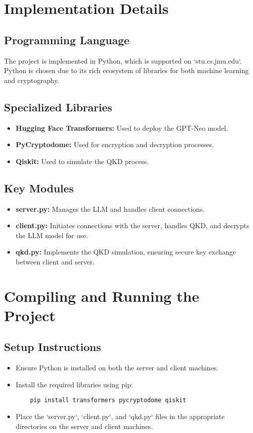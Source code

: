 \documentclass{article}
\begin{document}
\section{Implementation Details}

\subsection{Programming Language}
The project is implemented in Python, which is supported on `stu.cs.jmu.edu`. Python is chosen due to its rich ecosystem of libraries for both machine learning and cryptography.

\subsection{Specialized Libraries}
\begin{itemize}
    \item \textbf{Hugging Face Transformers:} Used to deploy the GPT-Neo model.
    \item \textbf{PyCryptodome:} Used for encryption and decryption processes.
    \item \textbf{Qiskit:} Used to simulate the QKD process.
\end{itemize}

\subsection{Key Modules}
\begin{itemize}
    \item \textbf{server.py:} Manages the LLM and handles client connections.
    \item \textbf{client.py:} Initiates connections with the server, handles QKD, and decrypts the LLM model for use.
    \item \textbf{qkd.py:} Implements the QKD simulation, ensuring secure key exchange between client and server.
\end{itemize}

\section{Compiling and Running the Project}

\subsection{Setup Instructions}
\begin{itemize}
    \item Ensure Python is installed on both the server and client machines.
    \item Install the required libraries using pip:
    \begin{verbatim}
    pip install transformers pycryptodome qiskit
    \end{verbatim}
    \item Place the `server.py`, `client.py`, and `qkd.py` files in the appropriate directories on the server and client machines.
\end{itemize}
\end{document}
